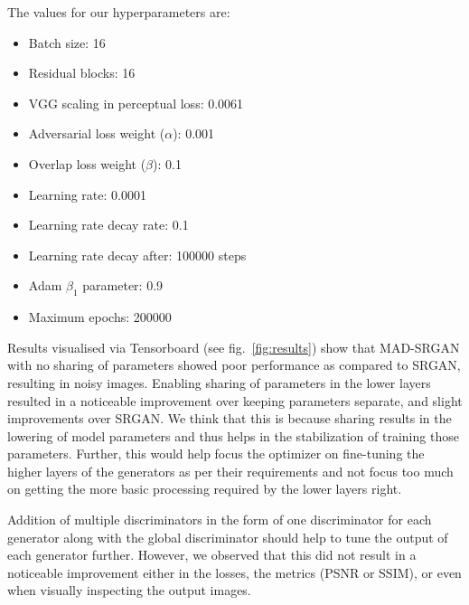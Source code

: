 \documentclass[12pt,a4paper]{article}
\begin{document}
\begin{multicols}{2}
            The values for our hyperparameters are:
            \begin{itemize}
                \item Batch size: 16
                \item Residual blocks: 16
                \item VGG scaling in perceptual loss: 0.0061
                \item Adversarial loss weight ($\alpha$): 0.001
                \item Overlap loss weight ($\beta$): 0.1
                \item Learning rate: 0.0001
                \item Learning rate decay rate: 0.1
                \item Learning rate decay after: 100000 steps
                \item Adam $\beta_1$ parameter: 0.9
                \item Maximum epochs: 200000
            \end{itemize}

            Results visualised via Tensorboard \cite{tensorflow} (see fig.~\ref{fig:results}) show that MAD-SRGAN with no sharing of parameters showed poor performance as compared to SRGAN, resulting in noisy images.
            Enabling sharing of parameters in the lower layers resulted in a noticeable improvement over keeping parameters separate, and slight improvements over SRGAN.
            We think that this is because sharing results in the lowering of model parameters and thus helps in the stabilization of training those parameters.
            Further, this would help focus the optimizer on fine-tuning the higher layers of the generators as per their requirements and not focus too much on getting the more basic processing required by the lower layers right.

            Addition of multiple discriminators in the form of one discriminator for each generator along with the global discriminator should help to tune the output of each generator further.
            However, we observed that this did not result in a noticeable improvement either in the losses, the metrics (PSNR or SSIM), or even when visually inspecting the output images.

        
        
    \end{multicols}

    \newpage
\end{document}
